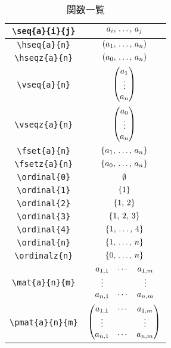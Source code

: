 \documentclass[twocolumn]{jsarticle}
\begin{document}
\newpage
\begin{table}[ht]
\caption{関数一覧}
\begin{tabular}{|c|c|}\hline
\verb|\seq{a}{i}{j}| & $a_{i},\,\ldots,\,a_{j}$\\ \hline
\verb|\hseq{a}{n}| & $(a_{1},\,\ldots,\,a_{n})$\\ \hline
\verb|\hseqz{a}{n}| & $(a_{0},\,\ldots,\,a_{n})$\\ \hline
\verb|\vseq{a}{n}| & $\begin{pmatrix}a_1\\ \vdots\\ a_{n} \end{pmatrix}$\\ \hline
\verb|\vseqz{a}{n}| & $\begin{pmatrix}a_0\\ \vdots\\ a_{n} \end{pmatrix}$\\ \hline
\verb|\fset{a}{n}| & $\{a_{1},\,\ldots,\,a_{n}\}$\\ \hline
\verb|\fsetz{a}{n}| & $\{a_{0},\,\ldots,\,a_{n}\}$\\ \hline
\verb|\ordinal{0}| & $\ordinal{0}$\\ \hline
\verb|\ordinal{1}| & $\ordinal{1}$\\ \hline
\verb|\ordinal{2}| & $\ordinal{2}$\\ \hline
\verb|\ordinal{3}| & $\ordinal{3}$\\ \hline
\verb|\ordinal{4}| & $\ordinal{4}$\\ \hline
\verb|\ordinal{n}| & $\ordinal{n}$\\ \hline
\verb|\ordinalz{n}| & $\ordinalz{n}$\\ \hline
\verb|\mat{a}{n}{m}| & $\begin{matrix}a_{1,1}&\cdots&a_{1,m}\\ \vdots&&\vdots\\ a_{n,1}&\cdots&a_{n,m}\end{matrix}$\\ \hline
\verb|\pmat{a}{n}{m}| & $\begin{pmatrix}a_{1,1}&\cdots&a_{1,m}\\ \vdots&&\vdots\\ a_{n,1}&\cdots&a_{n,m}\end{pmatrix}$\\ \hline
\end{tabular}
\end{table}
\end{document}
